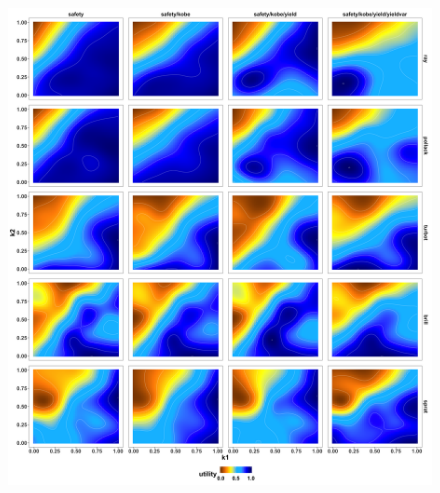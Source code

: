 \documentclass[preprint,review,12pt]{elsarticle}
\begin{document}
\begin{figure}[]\centering\includegraphics[width=5in]{fig6.png}\caption{}\label{fig:fig6}\end{figure}







\end{document}
